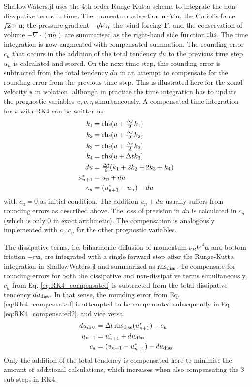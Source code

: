 ShallowWaters.jl uses the 4th-order Runge-Kutta scheme \citep{Butcher2008} to integrate the non-dissipative terms in time:
The momentum advection $\mathbf{u} \cdot \nabla \mathbf{u}$;
the Coriolis force $f\mathbf{\hat{z}} \times \mathbf{u}$;
the pressure gradient $-g\nabla \eta$;
the wind forcing $\mathbf{F}$;
and the conservation of volume $-\nabla \cdot (\mathbf{u} h)$ are summarised as the right-hand side function $\operatorname{rhs}$.
The time integration is now augmented with compensated summation. The rounding error $c_u$ that occurs in the addition
of the total tendency $du$ to the previous time step $u_n$ is calculated and stored. On the next time step, this rounding error
is subtracted from the total tendency $du$ in an attempt to compensate for the rounding error from the previous time step.
This is illustrated here for the zonal velocity $u$ in isolation, although in practice the time integration has to update the
prognostic variables $u,v,\eta$ simultaneously. A compensated time integration for $u$ with RK4 can be written as
\begin{align}
k_1 &= \operatorname{rhs}(u + \tfrac{\Delta t}{2}k_1) \nonumber \\
k_2 &= \operatorname{rhs}(u + \tfrac{\Delta t}{2}k_2) \nonumber \\
k_3 &= \operatorname{rhs}(u + \tfrac{\Delta t}{2}k_3) \nonumber \\
k_4 &= \operatorname{rhs}(u + \Delta t k_3) \nonumber \\
du &= \tfrac{\Delta t}{6}(k_1 + 2k_2 + 2k_3 + k_4) \nonumber \\
u_{n+1}^* &= u_n + du \nonumber \\
c_u &= (u^*_{n+1} - u_n) - du
\label{eq:RK4_compensated}
\end{align}
with $c_u = 0$ as initial condition. The addition $u_n + du$ usually suffers from rounding errors as described above.
The loss of precision in $du$ is calculated in $c_u$ (which is only 0 in exact arithmetic). The compensation is analogously
implemented with $c_v,c_\eta$  for the other prognostic variables.  

The dissipative terms, i.e. biharmonic diffusion of momentum $\nu_B\nabla^4\mathbf{u}$ and bottom friction $-r\mathbf{u}$,
are integrated with a single forward step after the Runge-Kutta integration in ShallowWaters.jl and summarized as 
$\operatorname{rhs}_{\operatorname{diss}}$. To compensate for rounding errors for both the dissipative and non-dissipative terms simultaneously,
$c_u$ from Eq. \ref{eq:RK4_compensated} is subtracted from the total dissipative tendency $du_{\operatorname{diss}}$.
In that sense, the rounding error from Eq. \ref{eq:RK4_compensated} is attempted to be compensated subsequently
in Eq. \ref{eq:RK4_compensated2}, and vice versa.
\begin{align}
du_{\operatorname{diss}} &= \Delta t \operatorname{rhs}_{\operatorname{diss}}(u_{n+1}^*) - c_u \nonumber \\
u_{n+1} &= u^*_{n+1} + du_{\operatorname{diss}} \nonumber \\
c_u &= (u_{n+1} - u_{n+1}^*) - du_{\operatorname{diss}}
\label{eq:RK4_compensated2}
\end{align}
Only the addition of the total tendency is compensated here to minimise the amount of additional calculations, which
increases when also compensating the 3 sub steps in RK4.

